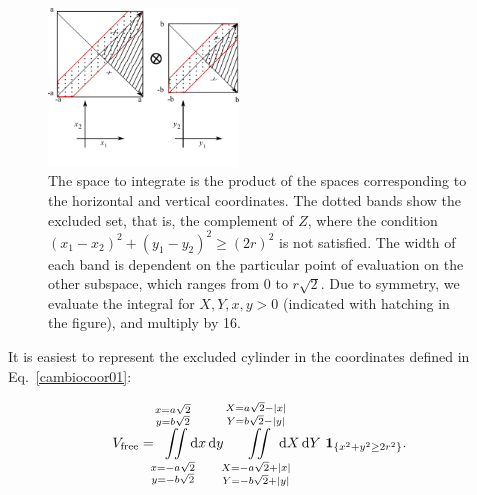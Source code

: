 \documentclass[superscriptaddress,pre,reprint,showpacs,twocolumn]{revtex4-1}
\newcommand{\rd}[1]{\mathrm{d}{#1} \,}
\newcommand{\indicatorsymbol}{\mathbf{1}}
\newcommand{\indicator}[1]{\indicatorsymbol_{ \{   #1 \} } }
\begin{document}
\begin{figure}[h]
  \begin{center}
    \includegraphics[width=0.45\textwidth]{figures/diagramintegra01.pdf}
  \end{center}
  \caption{The space to integrate is the product of the spaces
    corresponding to the horizontal and vertical coordinates. The dotted
    bands show the excluded set, that is, the complement of $Z$, where the condition 
    $ (x_1-x_2)^2 + (y_1-y_2)^2 \ge (2r)^2 $ is not satisfied.
    The width of each band is dependent on the particular 
    point of evaluation
    on the other subspace, which ranges from 0 to $r\sqrt{2}$. Due to symmetry, 
    we evaluate the integral for $X,Y,x,y > 0$ (indicated with hatching in the
    figure), and multiply by 16.
    \label{diagintegral01}  
    }
\end{figure}

It is easiest to represent the  
excluded cylinder in the coordinates defined in 
Eq.~\eqref{cambiocoor01}:

\begin{equation}\label{integraltotal}
  V_\text{free} = 
  \iint\limits_{\substack{ x=-a \sqrt{2} \\ y=-b \sqrt{2}}}
  ^{\substack{ x=a \sqrt{2} \\ y=b \sqrt{2}}}
   \mkern-9mu \rd x \rd y 
  \iint \limits_{\substack{X=-a\sqrt{2} + |x| \\ Y=-b \sqrt{2} + |y| }}^
  {\substack{X=a\sqrt{2} - |x| \\ Y=b \sqrt{2} - |y| }}
   \mkern-18mu  \rd X \rd Y
\, \indicator{ x^2 + y^2 \ge 2r^2  }.
\end{equation}
\end{document}
